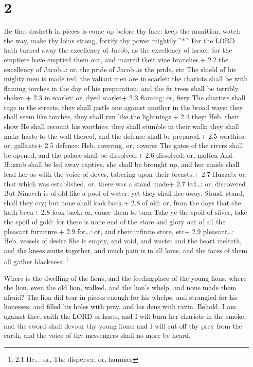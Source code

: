 \hypertarget{section-1}{%
\section{2}\label{section-1}}

 He that dasheth in pieces is come up before thy face: keep
the munition, watch the way, make thy loins strong, fortify thy power
mightily.\^{}*\^{}  For the LORD hath turned away the
excellency of Jacob, as the excellency of Israel: for the emptiers have
emptied them out, and marred their vine branches.+ 2.2 the excellency of
Jacob\ldots: or, the pride of Jacob as the pride, etc  The
shield of his mighty men is made red, the valiant men are in scarlet:
the chariots shall be with flaming torches in the day of his
preparation, and the fir trees shall be terribly shaken.+ 2.3 in
scarlet: or, dyed scarlet+ 2.3 flaming: or, fiery  The
chariots shall rage in the streets, they shall justle one against
another in the broad ways: they shall seem like torches, they shall run
like the lightnings.+ 2.4 they: Heb. their show  He shall
recount his worthies: they shall stumble in their walk; they shall make
haste to the wall thereof, and the defence shall be prepared.+ 2.5
worthies: or, gallants+ 2.5 defence: Heb. covering, or, coverer
 The gates of the rivers shall be opened, and the palace
shall be dissolved.+ 2.6 dissolved: or, molten  And Huzzab
shall be led away captive, she shall be brought up, and her maids shall
lead her as with the voice of doves, tabering upon their breasts.+ 2.7
Huzzab: or, that which was established, or, there was a stand made+ 2.7
led\ldots: or, discovered  But Nineveh is of old like a pool
of water: yet they shall flee away. Stand, stand, shall they cry; but
none shall look back.+ 2.8 of old: or, from the days that she hath been+
2.8 look back: or, cause them to turn  Take ye the spoil of
silver, take the spoil of gold: for there is none end of the store and
glory out of all the pleasant furniture.+ 2.9 for\ldots: or, and their
infinite store, etc+ 2.9 pleasant\ldots: Heb. vessels of desire
 She is empty, and void, and waste: and the heart melteth,
and the knees smite together, and much pain is in all loins, and the
faces of them all gather blackness. \footnote{2.1 He\ldots: or, The
  disperser, or, hammer}

 Where is the dwelling of the lions, and the feedingplace
of the young lions, where the lion, even the old lion, walked, and the
lion's whelp, and none made them afraid?  The lion did tear
in pieces enough for his whelps, and strangled for his lionesses, and
filled his holes with prey, and his dens with ravin. 
Behold, I am against thee, saith the LORD of hosts, and I will burn her
chariots in the smoke, and the sword shall devour thy young lions: and I
will cut off thy prey from the earth, and the voice of thy messengers
shall no more be heard.

